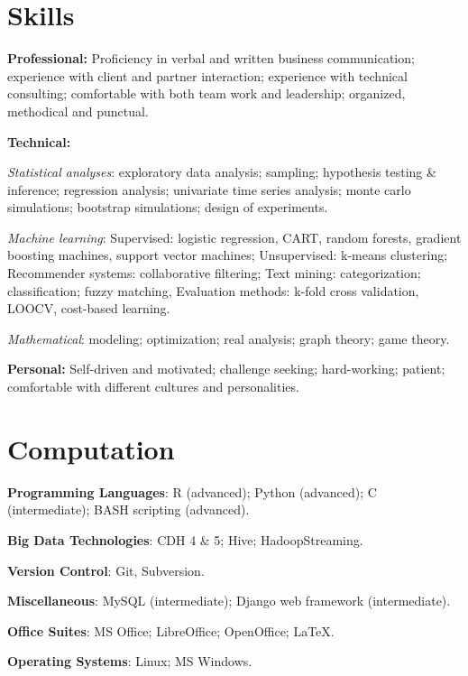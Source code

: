 \documentclass[a4paper,10pt]{article}
\renewenvironment{itemize}{
\begin{list}{}{
  \setlength{\leftmargin}{1.5em}
  }
  }{
\end{list}
}
\begin{document}
\section*{Skills}
\begin{itemize}
  \item \textbf{Professional:}
    Proficiency in verbal and written business communication; experience with
    client and partner interaction; experience with technical consulting;
    comfortable with both team work and leadership; organized, methodical and
    punctual.
  \item \textbf{Technical:}
    \begin{itemize}
      \item \emph{Statistical analyses}: exploratory data analysis; sampling;
        hypothesis testing \& inference; regression analysis; univariate time
        series analysis; monte carlo simulations; bootstrap simulations; design
        of experiments.
      \item \emph{Machine learning}: Supervised: logistic regression, CART,
        random forests, gradient boosting machines, support vector machines;
        Unsupervised: k-means clustering; Recommender systems: collaborative
        filtering; Text mining: categorization; classification; fuzzy matching,
        Evaluation methods: k-fold cross validation, LOOCV, cost-based
        learning.
      \item \emph{Mathematical}: modeling; optimization; real analysis; graph
        theory; game theory.
    \end{itemize}
  \item \textbf{Personal:}
    Self-driven and motivated; challenge seeking; hard-working; patient;
    comfortable with different cultures and personalities.
\end{itemize}

\section*{Computation}
\begin{itemize}
  \item \textbf{Programming Languages}: R (advanced); Python (advanced); C
    (intermediate); BASH scripting (advanced).
  \item \textbf{Big Data Technologies}: CDH 4 \& 5; Hive; HadoopStreaming.
  \item \textbf{Version Control}: Git, Subversion.
  \item \textbf{Miscellaneous}: MySQL (intermediate); Django web framework
    (intermediate).
  \item \textbf{Office Suites}: MS Office; LibreOffice; OpenOffice; \LaTeX{}.
  \item \textbf{Operating Systems}: Linux; MS Windows.
\end{itemize}
\end{document}
